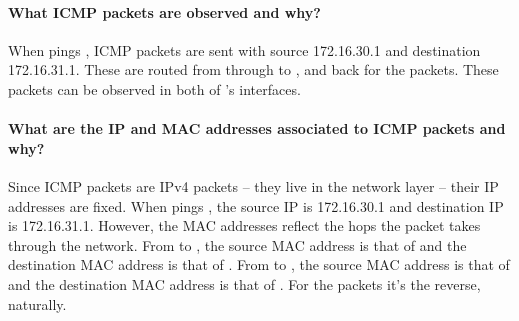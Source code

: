\documentclass[compilation.tex]{subfiles}
\begin{document}
\paragraph{What ICMP packets are observed and why?}
When  pings , ICMP  packets are sent with source 172.16.30.1 and destination 172.16.31.1. These are routed from  through  to , and back for the  packets. These packets can be observed in both of 's interfaces.

\paragraph{What are the IP and MAC addresses associated to ICMP packets and why?}
Since ICMP packets are IPv4 packets -- they live in the network layer -- their IP addresses are fixed.
When  pings , the source IP is 172.16.30.1 and destination IP is 172.16.31.1.
However, the MAC addresses reflect the hops the packet takes through the network.
From  to , the source MAC address is that of  and the destination MAC address is that of .
From  to , the source MAC address is that of  and the destination MAC address is that of .
For the  packets it's the reverse, naturally.
\end{document}

